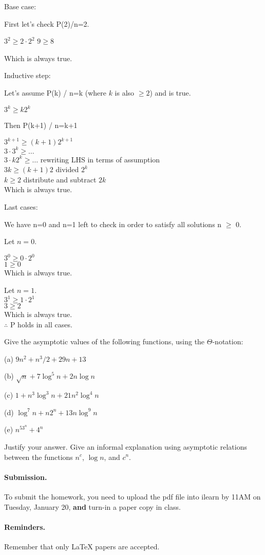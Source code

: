 \documentclass{article}
\begin{document}
\begin{flushleft}
Base case:

First let's check P(2)/n=2.

$3^2 \ge 2\cdot2^2$
$9 \ge 8$

Which is always true.

\vskip 0.1in
Inductive step:

Let's assume P(k) / n=k (where $k$ is also $\ge 2$) and is true.

$3^k \ge k2^k$

Then P(k+1) / n=k+1

$3^{k+1} \ge (k+1)2^{k+1}$ \\
$3\cdot3^k \ge \ldots $  \\
$3\cdot k 2^k \ge \ldots $ rewriting LHS in terms of assumption \\
$3k \ge (k+1)2$ divided $2^k$ \\
$k \ge 2$ distribute and subtract $2k$ \\
Which is always true.

\vskip 0.1in
Last cases:

We have n=0 and n=1 left to check in order to satisfy all solutions n $\ge$ 0.

Let $n=0$.

$3^0 \ge 0\cdot2^0$\\
$1 \ge 0$\\

Which is always true.

Let $n=1$.\\
$3^1 \ge 1\cdot2^1$\\
$3 \ge 2$\\
Which is always true.\\

\vskip 0.1in
$\therefore$ P holds in all cases.

\end{flushleft}




\begin{problem}
Give the asymptotic values of the
following functions, using the $\Theta$-notation:
%
\begin{description}
%
\item{(a)} $9n^2 + n^3/2 + 29n + 13$
\item{(b)} $\sqrt{n}+ 7\log^5 n + 2n\log n$
\item{(c)} $1+ n^3\log^3n + 21 n^2\log^4n$
\item{(d)} $\log^7n + n 2^n + 13n\log^9n$
\item{(e)} $n^53^n+4^n$
%
\end{description}
%
Justify your answer.
Give an informal explanation using asymptotic
relations between the functions $n^c$, $\log n$, and $c^n$.
\end{problem}



\vskip 0.1in
\paragraph{Submission.}
To submit the homework, you need to upload the pdf file into ilearn by 11AM on Tuesday, January 20,
\textbf{and} turn-in a paper copy in class.

\paragraph{Reminders.}
Remember that only {\LaTeX} papers are accepted. 
\end{document}
